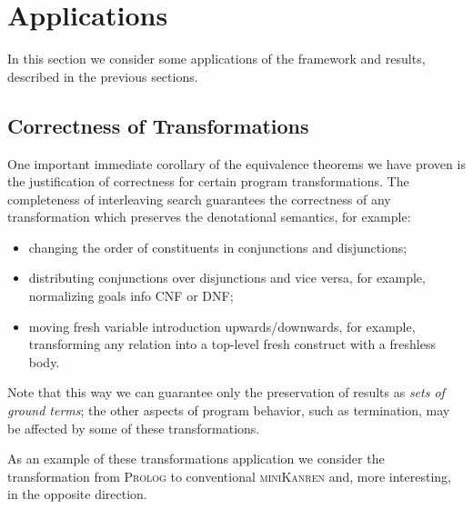 \section{Applications}
\label{applications}

In this section we consider some applications of the framework and results, described in the previous sections.

\subsection{Correctness of Transformations}

One important immediate corollary of the equivalence theorems we have proven is the justification of correctness for certain program transformations.
The completeness of interleaving search guarantees the correctness of any transformation which preserves the denotational semantics,
for example:

\begin{itemize}
\item changing the order of constituents in conjunctions and disjunctions;
\item distributing conjunctions over disjunctions and vice versa, for example, normalizing goals info CNF or DNF;
\item moving fresh variable introduction upwards/downwards, for example, transforming any relation into a top-level fresh
  construct with a freshless body.
\end{itemize}

Note that this way we can guarantee only the preservation of results as \emph{sets of ground terms}; the other aspects of program behavior,
such as termination, may be affected by some of these transformations. 

As an example of these transformations application we consider the transformation from \textsc{Prolog} to conventional \textsc{miniKanren} and,
more interesting, in the opposite direction.

